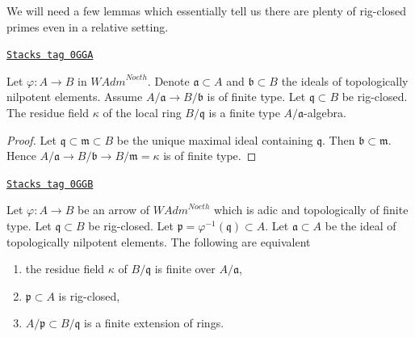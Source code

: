 We will need a few lemmas which essentially tell us there are
plenty of rig-closed primes even in a relative setting.

\begin{lemma}
\label{restricted-lemma-rig-closed-point-relative-residue-field}
\href{https://stacks.math.columbia.edu/tag/0GGA}{\texttt{Stacks tag 0GGA}}

Let $\varphi : A \to B$ in $\textit{WAdm}^{Noeth}$.
Denote $\mathfrak a \subset A$ and $\mathfrak b \subset B$
the ideals of topologically nilpotent elements. Assume
$A/\mathfrak a \to B/\mathfrak b$ is of finite type.
Let $\mathfrak q \subset B$ be rig-closed.
The residue field $\kappa$ of the local ring $B/\mathfrak q$
is a finite type $A/\mathfrak a$-algebra.
\end{lemma}

\begin{proof}
Let $\mathfrak q \subset \mathfrak m \subset B$ be the unique
maximal ideal containing $\mathfrak q$.
Then $\mathfrak b \subset \mathfrak m$. Hence
$A/\mathfrak a \to B/\mathfrak b \to B/\mathfrak m = \kappa$ is
of finite type.
\end{proof}

\begin{lemma}
\label{restricted-lemma-rig-closed-point-relative}
\href{https://stacks.math.columbia.edu/tag/0GGB}{\texttt{Stacks tag 0GGB}}

Let $\varphi : A \to B$ be an arrow of $\textit{WAdm}^{Noeth}$
which is adic and topologically of finite type.
Let $\mathfrak q \subset B$ be rig-closed.
Let $\mathfrak p = \varphi^{-1}(\mathfrak q) \subset A$.
Let $\mathfrak a \subset A$ be the ideal of topologically nilpotent
elements.
The following are equivalent
\begin{enumerate}
\item the residue field $\kappa$ of $B/\mathfrak q$ is finite
over $A/\mathfrak a$,
\item $\mathfrak p \subset A$ is rig-closed,
\item $A/\mathfrak p \subset B/\mathfrak q$ is a finite extension
of rings.
\end{enumerate}
\end{lemma}

